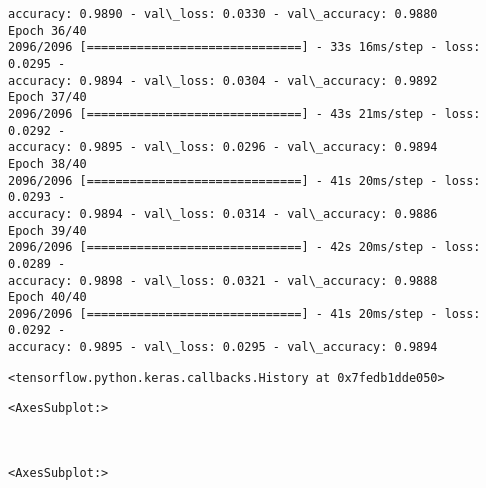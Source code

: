 \documentclass[11pt]{article}
\makeatletter
\newcommand{\boxspacing}{\kern\kvtcb@left@rule\kern\kvtcb@boxsep}
\newcommand{\prompt}[4]{
        {\ttfamily\llap{{\color{#2}[#3]:\hspace{3pt}#4}}\vspace{-\baselineskip}}
    }
\makeatother
\begin{document}
\begin{Verbatim}[commandchars=\\\{\}]
accuracy: 0.9890 - val\_loss: 0.0330 - val\_accuracy: 0.9880
Epoch 36/40
2096/2096 [==============================] - 33s 16ms/step - loss: 0.0295 -
accuracy: 0.9894 - val\_loss: 0.0304 - val\_accuracy: 0.9892
Epoch 37/40
2096/2096 [==============================] - 43s 21ms/step - loss: 0.0292 -
accuracy: 0.9895 - val\_loss: 0.0296 - val\_accuracy: 0.9894
Epoch 38/40
2096/2096 [==============================] - 41s 20ms/step - loss: 0.0293 -
accuracy: 0.9894 - val\_loss: 0.0314 - val\_accuracy: 0.9886
Epoch 39/40
2096/2096 [==============================] - 42s 20ms/step - loss: 0.0289 -
accuracy: 0.9898 - val\_loss: 0.0321 - val\_accuracy: 0.9888
Epoch 40/40
2096/2096 [==============================] - 41s 20ms/step - loss: 0.0292 -
accuracy: 0.9895 - val\_loss: 0.0295 - val\_accuracy: 0.9894
    \end{Verbatim}

            \begin{tcolorbox}[breakable, size=fbox, boxrule=.5pt, pad at break*=1mm, opacityfill=0]
\prompt{Out}{outcolor}{69}{\boxspacing}
\begin{Verbatim}[commandchars=\\\{\}]
<tensorflow.python.keras.callbacks.History at 0x7fedb1dde050>
\end{Verbatim}
\end{tcolorbox}
        
            \begin{tcolorbox}[breakable, size=fbox, boxrule=.5pt, pad at break*=1mm, opacityfill=0]
\prompt{Out}{outcolor}{71}{\boxspacing}
\begin{Verbatim}[commandchars=\\\{\}]
<AxesSubplot:>
\end{Verbatim}
\end{tcolorbox}
        
    \begin{center}
    \end{center}
    { \hspace*{\fill} \\}
    
            \begin{tcolorbox}[breakable, size=fbox, boxrule=.5pt, pad at break*=1mm, opacityfill=0]
\prompt{Out}{outcolor}{72}{\boxspacing}
\begin{Verbatim}[commandchars=\\\{\}]
<AxesSubplot:>
\end{Verbatim}
\end{tcolorbox}
        
\end{document}
